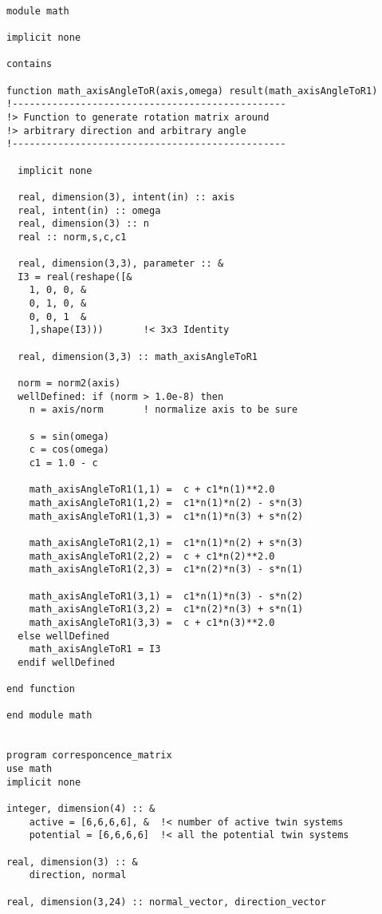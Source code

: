 \begin{verbatim}

module math

implicit none

contains

function math_axisAngleToR(axis,omega) result(math_axisAngleToR1)
!------------------------------------------------
!> Function to generate rotation matrix around 
!> arbitrary direction and arbitrary angle
!------------------------------------------------

  implicit none
  
  real, dimension(3), intent(in) :: axis
  real, intent(in) :: omega
  real, dimension(3) :: n
  real :: norm,s,c,c1
  
  real, dimension(3,3), parameter :: &
  I3 = real(reshape([&
    1, 0, 0, &
    0, 1, 0, &
    0, 0, 1  &
    ],shape(I3)))       !< 3x3 Identity

  real, dimension(3,3) :: math_axisAngleToR1
  
  norm = norm2(axis)
  wellDefined: if (norm > 1.0e-8) then
    n = axis/norm       ! normalize axis to be sure
  
    s = sin(omega)
    c = cos(omega)
    c1 = 1.0 - c
  
    math_axisAngleToR1(1,1) =  c + c1*n(1)**2.0
    math_axisAngleToR1(1,2) =  c1*n(1)*n(2) - s*n(3)
    math_axisAngleToR1(1,3) =  c1*n(1)*n(3) + s*n(2)
                              
    math_axisAngleToR1(2,1) =  c1*n(1)*n(2) + s*n(3)
    math_axisAngleToR1(2,2) =  c + c1*n(2)**2.0
    math_axisAngleToR1(2,3) =  c1*n(2)*n(3) - s*n(1)
                              
    math_axisAngleToR1(3,1) =  c1*n(1)*n(3) - s*n(2)
    math_axisAngleToR1(3,2) =  c1*n(2)*n(3) + s*n(1)
    math_axisAngleToR1(3,3) =  c + c1*n(3)**2.0
  else wellDefined
    math_axisAngleToR1 = I3
  endif wellDefined
  
end function

end module math


program corresponcence_matrix
use math
implicit none

integer, dimension(4) :: &
    active = [6,6,6,6], &  !< number of active twin systems
    potential = [6,6,6,6]  !< all the potential twin systems

real, dimension(3) :: &
    direction, normal

real, dimension(3,24) :: normal_vector, direction_vector


\end{verbatim}
